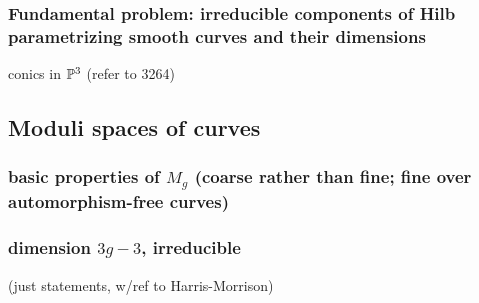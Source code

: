 \subsubsection{Fundamental problem: irreducible components of Hilb parametrizing smooth curves and their dimensions}

\begin{example}
conics in ${\mathbb P}^3$ (refer to 3264)
\end{example}

\subsection{Moduli spaces of curves}

\subsubsection{basic properties of $M_g$ (coarse rather than fine; fine over automorphism-free curves)}

\subsubsection{dimension $3g-3$, irreducible}  (just statements, w/ref to Harris-Morrison)



